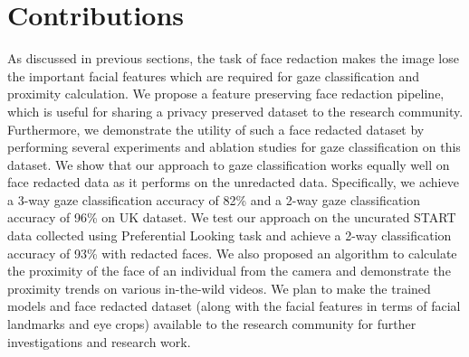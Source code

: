 \section{Contributions}
As discussed in previous sections, the task of face redaction makes the image lose the important facial features which are required for gaze classification and proximity calculation. We propose a feature preserving face redaction pipeline, which is useful for sharing a privacy preserved dataset to the research community. Furthermore, we demonstrate the utility of such a face redacted dataset by performing several experiments and ablation studies for gaze classification on this dataset. We show that our approach to gaze classification works equally well on face redacted data as it performs on the unredacted data. Specifically, we achieve a 3-way gaze classification accuracy of 82\% and a 2-way gaze classification accuracy of 96\% on UK dataset. We test our approach on the uncurated START data collected using Preferential Looking task and achieve a 2-way classification accuracy of 93\% with redacted faces. We also proposed an algorithm to calculate the proximity of the face of an individual from the camera and demonstrate the proximity trends on various in-the-wild videos. We plan to make the trained models and face redacted dataset (along with the facial features in terms of facial landmarks and eye crops) available to the research community for further investigations and research work.